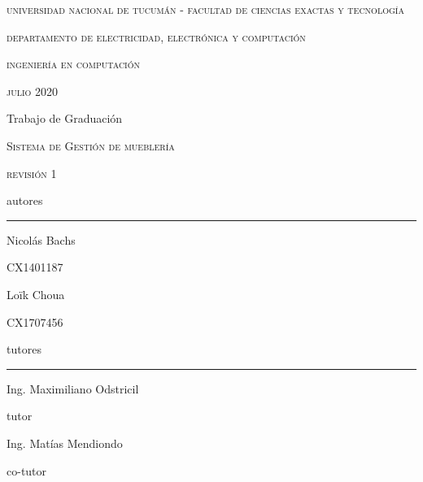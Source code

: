 \documentclass[a4paper,oneside]{book}
\begin{document}
\sloppy

\begin{titlepage}
	\centering
	{\scshape universidad nacional de tucumán - facultad de ciencias exactas y tecnología\par}
	{\scshape departamento de electricidad, electrónica y computación\par}
	{\scshape\Large ingeniería en computación\par}
	\vspace{0.5cm}
	{\scshape julio 2020\par} %
	\vfill
	{\LARGE\mdseries Trabajo de Graduación\par}
	\vspace{0.5cm}
	{\scshape\huge Sistema de Gestión de mueblería\par}
	{\scshape revisión 1\par}
	\vfill
	{\mdseries autores\par}
	\par\noindent\rule{0.9\textwidth}{0.2pt}
	\begin{multicols}{2}
	{\large Nicolás Bachs\par}
	{\small CX1401187\par}
	\columnbreak
	{\large Loïk Choua\par}
	{\small CX1707456\par}
	\end{multicols}
	\vspace{0.5cm}
	{\mdseries tutores\par}
	\par\noindent\rule{0.9\textwidth}{0.2pt}
	\begin{multicols}{2}
	{\large Ing. Maximiliano Odstricil\par}
	{\small tutor\par}
	\columnbreak
	{\large Ing. Matías Mendiondo\par}
	{\small co-tutor\par}
	\end{multicols}
\end{titlepage}



\tableofcontents









%
\end{document}

